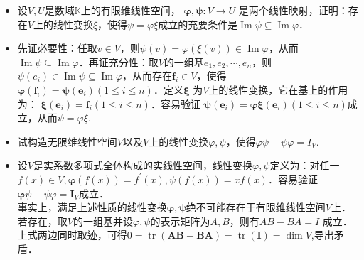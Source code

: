 \documentclass[14pt]{beamer}
\begin{document}
\begin{frame}
	\begin{itemize}
		\item<1-> 设$  V, U  $是数域$  \mathbb{K}  $上的有限维线性空间，  $\boldsymbol{\varphi}, \boldsymbol{\psi}: V \rightarrow U $ 是两个线性映射，证明：存在$  V  $上的线性变换$  \xi  $，使得$  \psi=\varphi \xi  $成立的充要条件是$  \operatorname{Im} \psi \subseteq \operatorname{Im} \varphi  $．
		\item<2-> 先证必要性：任取$  v \in V  $，则$  \psi(v)=\varphi(\xi(v)) \in \operatorname{Im} \varphi  $，从而$  \operatorname{Im} \psi \subseteq \operatorname{Im} \varphi  $．再证充分性：取$  V  $的一组基$  e_{1}, e_{2}, \cdots, e_{n}  $，则$  \psi\left(e_{i}\right) \in \operatorname{Im} \psi \subseteq \operatorname{Im} \varphi  $，从而存在$  \boldsymbol{f}_{i} \in V  $，使得  $\boldsymbol{\varphi}\left(\boldsymbol{f}_{i}\right)=\boldsymbol{\psi}\left(\boldsymbol{e}_{i}\right)(1 \leq i \leq n)  $．定义$  \boldsymbol{\xi} $ 为$  V  $上的线性变换，它在基上的作用为：  $\boldsymbol{\xi}\left(\boldsymbol{e}_{i}\right)=\boldsymbol{f}_{i}(1 \leq i \leq n)  $．容易验证  $\boldsymbol{\psi}\left(\boldsymbol{e}_{i}\right)=\boldsymbol{\varphi} \boldsymbol{\xi}\left(\boldsymbol{e}_{i}\right)(1 \leq i \leq n)  $成立，从而$  \psi=\varphi \xi $.
	\end{itemize}
\end{frame}

\begin{frame}
	\begin{itemize}
	\item<1-> 试构造无限维线性空间$  V  $以及$  V  $上的线性变换$  \varphi, \psi  $，使得$  \varphi \psi-   \psi \varphi=I_{V} $.\\
	\item<2-> 设$  V  $是实系数多项式全体构成的实线性空间，线性变换$  \varphi, \psi  $定义为：对任一$  f(x) \in V, \boldsymbol{\varphi}(f(x))=f^{\prime}(x), \psi(f(x))=x f(x)  $．容易验证$  \boldsymbol{\varphi} \psi-\psi \varphi=\boldsymbol{I}_{V}  $成立．\\
	事实上，满足上述性质的线性变换$  \boldsymbol{\varphi}, \boldsymbol{\psi}  $绝不可能存在于有限维线性空间$  V $上．若存在，取$  V  $的一组基并设$  \varphi, \psi  $的表示矩阵为$  A, B  $，则有$  A B-B A=I $ 成立．上式两边同时取迹，可得$0=\operatorname{tr}(\boldsymbol{A} \boldsymbol{B}-\boldsymbol{B} \boldsymbol{A})=\operatorname{tr}(\boldsymbol{I})=\operatorname{dim} V$,导出矛盾．
	\end{itemize}
	
\end{frame}
\end{document}
